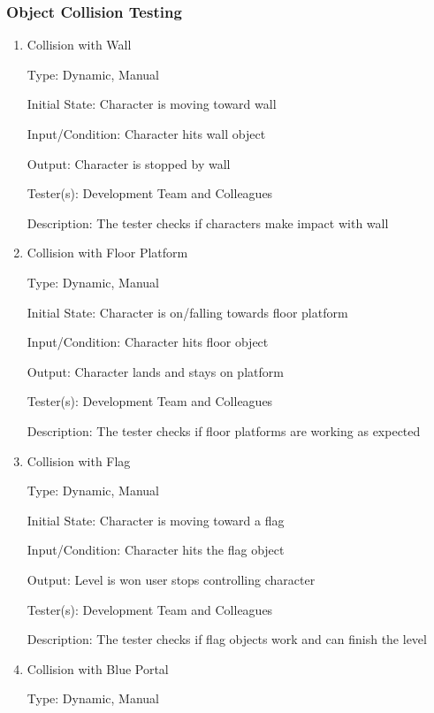 \documentclass[12pt, titlepage]{article}
\begin{document}
\subsubsection{Object Collision Testing}

\begin{enumerate}

\item{Collision with Wall\\}

Type: Dynamic, Manual

Initial State: Character is moving toward wall

Input/Condition: Character hits wall object

Output: Character is stopped by wall

Tester(s): Development Team and Colleagues

Description: The tester checks if characters make impact with wall


\item{Collision with Floor Platform\\}

Type: Dynamic, Manual

Initial State: Character is on/falling towards floor platform

Input/Condition: Character hits floor object

Output: Character lands and stays on platform

Tester(s): Development Team and Colleagues

Description: The tester checks if floor platforms are working as expected


\item{Collision with Flag\\}

Type: Dynamic, Manual

Initial State: Character is moving toward a flag

Input/Condition: Character hits the flag object

Output: Level is won user stops controlling character

Tester(s): Development Team and Colleagues

Description: The tester checks if flag objects work and can finish the level


\item{Collision with Blue Portal\\}

Type: Dynamic, Manual


\end{enumerate}
\end{document}
